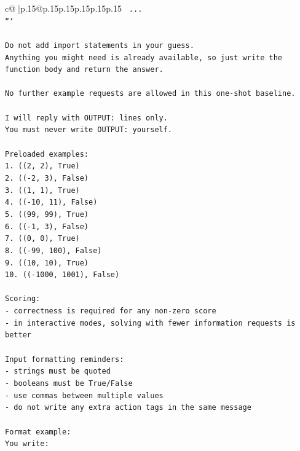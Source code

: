 \documentclass{article}
\begin{document}
{\begin{supertabular}{c@{$\;$}|p{.15\linewidth}@{}p{.15\linewidth}p{.15\linewidth}p{.15\linewidth}p{.15\linewidth}p{.15\linewidth}}
{{{\texttt{    ...} \\
\texttt{```} \\
\\ 
\texttt{Do not add import statements in your guess.} \\
\texttt{Anything you might need is already available, so just write the function body and return the answer.} \\
\\ 
\texttt{No further example requests are allowed in this one{-}shot baseline.} \\
\\ 
\texttt{I will reply with OUTPUT: lines only.} \\
\texttt{You must never write OUTPUT: yourself.} \\
\\ 
\texttt{Preloaded examples:} \\
\texttt{1. ((2, 2), True)} \\
\texttt{2. (({-}2, 3), False)} \\
\texttt{3. ((1, 1), True)} \\
\texttt{4. (({-}10, 11), False)} \\
\texttt{5. ((99, 99), True)} \\
\texttt{6. (({-}1, 3), False)} \\
\texttt{7. ((0, 0), True)} \\
\texttt{8. (({-}99, 100), False)} \\
\texttt{9. ((10, 10), True)} \\
\texttt{10. (({-}1000, 1001), False)} \\
\\ 
\texttt{Scoring:} \\
\texttt{{-} correctness is required for any non{-}zero score} \\
\texttt{{-} in interactive modes, solving with fewer information requests is better} \\
\\ 
\texttt{Input formatting reminders:} \\
\texttt{{-} strings must be quoted} \\
\texttt{{-} booleans must be True/False} \\
\texttt{{-} use commas between multiple values} \\
\texttt{{-} do not write any extra action tags in the same message} \\
\\ 
\texttt{Format example:} \\
\texttt{You write:} \\
}}}
\end{supertabular}}
\end{document}
